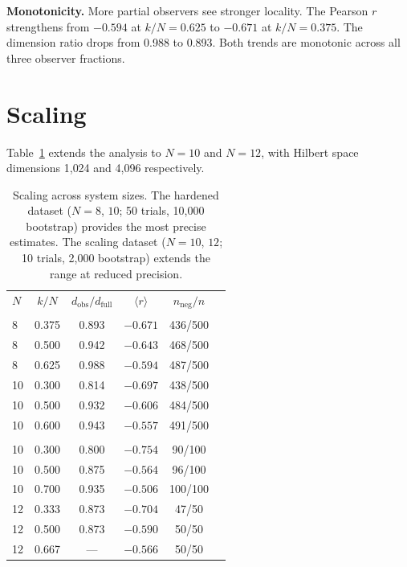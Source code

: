\documentclass[aps,pra,twocolumn,superscriptaddress]{revtex4-2}
\begin{document}
\textbf{Monotonicity.}
More partial observers see stronger locality. The Pearson $r$ strengthens from $-0.594$ at $k/N = 0.625$ to $-0.671$ at $k/N = 0.375$. The dimension ratio drops from 0.988 to 0.893. Both trends are monotonic across all three observer fractions.


\section{Scaling}
\label{sec:scaling}

Table~\ref{tab:scaling} extends the analysis to $N = 10$ and $N = 12$, with Hilbert space dimensions 1{,}024 and 4{,}096 respectively.

\begin{table}[t]
\caption{Scaling across system sizes. The hardened dataset ($N = 8$, $10$; 50 trials, 10{,}000 bootstrap) provides the most precise estimates. The scaling dataset ($N = 10$, $12$; 10 trials, 2{,}000 bootstrap) extends the range at reduced precision.}
\label{tab:scaling}
\begin{ruledtabular}
\begin{tabular}{lccccc}
$N$ & $k/N$ & $d_\text{obs}/d_\text{full}$ & $\langle r \rangle$ & $n_\text{neg}/n$ \\
\colrule
\multicolumn{5}{c}{\textit{Hardened (50 trials)}} \\
8 & 0.375 & 0.893 & $-0.671$ & 436/500 \\
8 & 0.500 & 0.942 & $-0.643$ & 468/500 \\
8 & 0.625 & 0.988 & $-0.594$ & 487/500 \\
10 & 0.300 & 0.814 & $-0.697$ & 438/500 \\
10 & 0.500 & 0.932 & $-0.606$ & 484/500 \\
10 & 0.600 & 0.943 & $-0.557$ & 491/500 \\
\colrule
\multicolumn{5}{c}{\textit{Scaling (10 trials)}} \\
10 & 0.300 & 0.800 & $-0.754$ & 90/100 \\
10 & 0.500 & 0.875 & $-0.564$ & 96/100 \\
10 & 0.700 & 0.935 & $-0.506$ & 100/100 \\
12 & 0.333 & 0.873 & $-0.704$ & 47/50 \\
12 & 0.500 & 0.873 & $-0.590$ & 50/50 \\
12 & 0.667 & --- & $-0.566$ & 50/50 \\
\end{tabular}
\end{ruledtabular}
\end{table}
\end{document}
